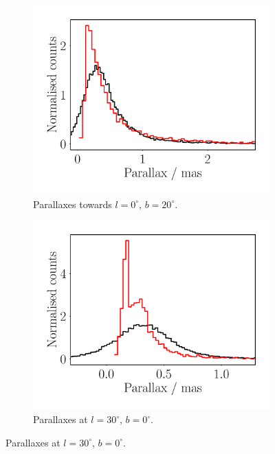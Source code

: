 \documentclass[fleqn,usenatbib]{mnras}
\begin{document}
\begin{figure}
    \centering
    \begin{subfigure}[b]{0.3\textwidth}
        \centering
        \includegraphics[width=\textwidth]{Plots/plot_dist_gaia_0_20_18.pdf}
        \caption{Parallaxes towards $l = 0^\circ$, $b = 20^\circ$.}
        \label{fig:l0dist}
    \end{subfigure}
    \begin{subfigure}[b]{0.3\textwidth}
        \centering
        \includegraphics[width=\textwidth]{Plots/plot_dist_gaia_30_0_18.pdf}
        \caption{Parallaxes at $l = 30^\circ$, $b = 0^\circ$.}

\end{subfigure}
\end{figure}
\end{document}
